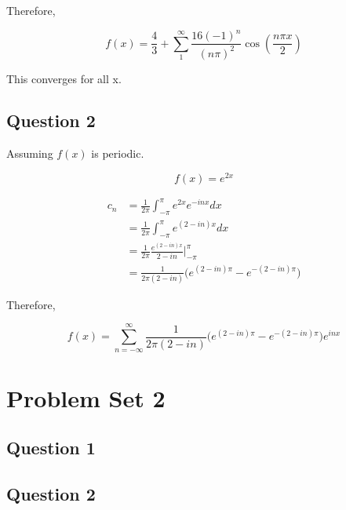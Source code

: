 \documentclass[titlepage]{article}
\begin{document}
Therefore,

$$f(x) = \frac{4}{3} + \sum_1^{\infty} \frac{16 (-1)^n}{(n\pi)^2}\cos(\frac{n\pi x}{2})$$

This converges for all x.
\subsection*{Question 2}

Assuming $f(x)$ is periodic.

$$f(x) = e^{2x}$$

\begin{align*}
    c_n &= \frac{1}{2\pi} \int_{-\pi}^{\pi} e^{2x}e^{-inx} dx
    \\ &= \frac{1}{2\pi} \int_{-\pi}^{\pi} e^{(2 - in)x} dx
    \\ &= \frac{1}{2\pi} \frac{e^{(2 - in)x}}{2 - in} \bigg|_{-\pi}^{\pi}
    \\ &= \frac{1}{2\pi(2 - in)}\bigg(e^{(2 - in)\pi} - e^{-(2 - in)\pi}\bigg)
\end{align*}

Therefore,

$$f(x) = \sum_{n=-\infty}^{\infty} \frac{1}{2\pi(2 - in)}\bigg(e^{(2 - in)\pi} - e^{-(2 - in)\pi}\bigg) e^{inx}$$
\section*{Problem Set 2}
\subsection*{Question 1}
\subsection*{Question 2}
\end{document}
